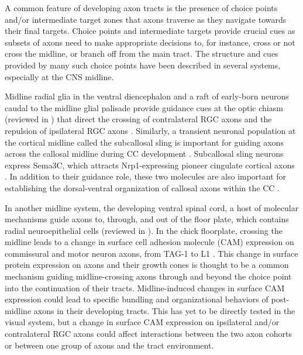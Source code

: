 A common feature of developing axon tracts is the presence of choice points and/or intermediate target zones that axons traverse as they navigate towards their final targets.
Choice points and intermediate targets provide crucial cues as subsets of axons need to make appropriate decisions to, for instance, cross or not cross the midline, or branch off from the main tract.
The structure and cues provided by many such choice points have been described in several systems, especially at the CNS midline.

Midline radial glia in the ventral diencephalon and a raft of early-born neurons caudal to the midline glial palisade provide guidance cues at the optic chiasm (reviewed in ) that direct the crossing of contralateral RGC axons \cite{charron2003morphogen,erskine2011vegf,kuwajima2012optic,williams2006role} and the repulsion of ipsilateral RGC axons \cite{williams2003ephrin,petros2010ephrin,petros2009specificity}. 
Similarly, a transient neuronal population at the cortical midline called the subcallosal sling is important for guiding axons across the callosal midline during CC development \cite{suarez2014evolution}. 
Subcallosal sling neurons express Sema3C, which attracts Nrp1-expressing pioneer cingulate cortical axons \cite{niquille2009transient,piper2009neuropilin}. 
In addition to their guidance role, these two molecules are also important for establishing the dorsal-ventral organization of callosal axons within the CC \cite{zhou2013axon}. 

In another midline system, the developing ventral spinal cord, a host of molecular mechanisms guide axons to, through, and out of the floor plate, which contains radial neuroepithelial cells (reviewed in ).
In the chick floorplate, crossing the midline leads to a change in surface cell adhesion molecule (CAM) expression on commissural and motor neuron axons, from TAG-1 to L1 \cite{dodd1988spatial}.
This change in surface protein expression on axons and their growth cones is thought to be a common mechanism guiding midline-crossing axons through and beyond the choice point into the continuation of their tracts.
Midline-induced changes in surface CAM expression could lead to specific bundling and organizational behaviors of post-midline axons in their developing tracts.
This has yet to be directly tested in the visual system, but a change in surface CAM expression on ipsilateral and/or contralateral RGC axons could affect interactions between the two axon cohorts or between one group of axons and the tract environment. 

